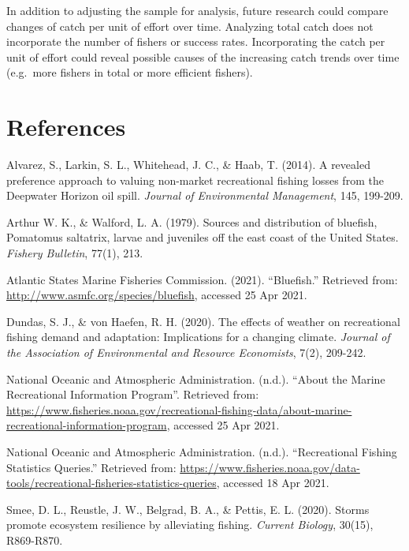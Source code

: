 \documentclass[
  12pt,
]{article}
\begin{document}
In addition to adjusting the sample for analysis, future research could
compare changes of catch per unit of effort over time. Analyzing total
catch does not incorporate the number of fishers or success rates.
Incorporating the catch per unit of effort could reveal possible causes
of the increasing catch trends over time (e.g.~more fishers in total or
more efficient fishers).

\newpage

\hypertarget{references}{%
\section{References}\label{references}}

Alvarez, S., Larkin, S. L., Whitehead, J. C., \& Haab, T. (2014). A
revealed preference approach to valuing non-market recreational fishing
losses from the Deepwater Horizon oil spill. \emph{Journal of
Environmental Management}, 145, 199-209.

Arthur W. K., \& Walford, L. A. (1979). Sources and distribution of
bluefish, Pomatomus saltatrix, larvae and juveniles off the east coast
of the United States. \emph{Fishery Bulletin}, 77(1), 213.

Atlantic States Marine Fisheries Commission. (2021). ``Bluefish.''
Retrieved from: \url{http://www.asmfc.org/species/bluefish}, accessed 25
Apr 2021.

Dundas, S. J., \& von Haefen, R. H. (2020). The effects of weather on
recreational fishing demand and adaptation: Implications for a changing
climate. \emph{Journal of the Association of Environmental and Resource
Economists}, 7(2), 209-242.

National Oceanic and Atmospheric Administration. (n.d.). ``About the
Marine Recreational Information Program''. Retrieved from:
\url{https://www.fisheries.noaa.gov/recreational-fishing-data/about-marine-recreational-information-program},
accessed 25 Apr 2021.

National Oceanic and Atmospheric Administration. (n.d.). ``Recreational
Fishing Statistics Queries.'' Retrieved from:
\url{https://www.fisheries.noaa.gov/data-tools/recreational-fisheries-statistics-queries},
accessed 18 Apr 2021.

Smee, D. L., Reustle, J. W., Belgrad, B. A., \& Pettis, E. L. (2020).
Storms promote ecosystem resilience by alleviating fishing.
\emph{Current Biology}, 30(15), R869-R870.
\end{document}
